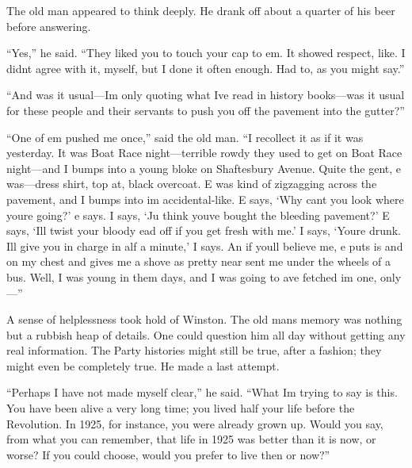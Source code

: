 The old man appeared to think deeply. He drank off about a quarter of
his beer before answering.

``Yes,'' he said. ``They liked you to touch your cap to
\textquotesingle em. It showed respect, like. I didn\textquotesingle t
agree with it, myself, but I done it often enough. Had to, as you might
say.''

``And was it usual---I\textquotesingle m only quoting what
I\textquotesingle ve read in history books---was it usual for these
people and their servants to push you off the pavement into the gutter?''

``One of em pushed me once,'' said the old man. ``I recollect it as if it
was yesterday. It was Boat Race night---terrible rowdy they used to get
on Boat Race night---and I bumps into a young bloke on Shaftesbury
Avenue. Quite the gent, \textquotesingle e was---dress shirt, top
\textquotesingle at, black overcoat. \textquotesingle E was kind of
zigzagging across the pavement, and I bumps into \textquotesingle im
accidental-like. \textquotesingle E says, `Why
can\textquotesingle t you look where you\textquotesingle re
going?' \textquotesingle e says. I says,
`Ju think you\textquotesingle ve bought the bleeding
pavement?' \textquotesingle E says,
`I\textquotesingle ll twist your bloody
\textquotesingle ead off if you get fresh with me.' I
says, `You\textquotesingle re drunk.
I\textquotesingle ll give you in charge in \textquotesingle alf a
minute,' I says. \textquotesingle An if
you\textquotesingle ll believe me, \textquotesingle e puts
\textquotesingle is \textquotesingle and on my chest and gives me a
shove as pretty near sent me under the wheels of a bus. Well, I was
young in them days, and I was going to \textquotesingle ave fetched
\textquotesingle im one, only---''

A sense of helplessness took hold of Winston. The old
man\textquotesingle s memory was nothing but a rubbish heap of details.
One could question him all day without getting any real information. The
Party histories might still be true, after a fashion; they might even be
completely true. He made a last attempt.

``Perhaps I have not made myself clear,'' he said. ``What
I\textquotesingle m trying to say is this. You have been alive a very
long time; you lived half your life before the Revolution. In 1925, for
instance, you were already grown up. Would you say, from what you can
remember, that life in 1925 was better than it is now, or worse? If you
could choose, would you prefer to live then or now?''

